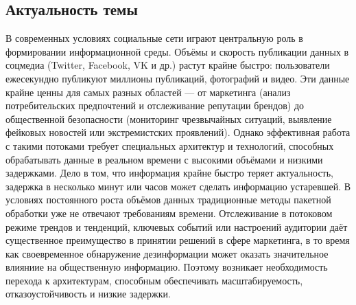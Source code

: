     \subsection{Актуальность темы}
        В современных условиях социальные сети играют центральную роль в формировании информационной среды. Объёмы и скорость публикации данных в соцмедиа (Twitter, Facebook, VK и др.) растут крайне быстро: пользователи ежесекундно публикуют миллионы публикаций, фотографий и видео. Эти данные крайне ценны для самых разных областей — от маркетинга (анализ потребительских предпочтений и отслеживание репутации брендов) до общественной безопасности (мониторинг чрезвычайных ситуаций, выявление фейковых новостей или экстремистских проявлений). Однако эффективная работа с такими потоками требует специальных архитектур и технологий, способных обрабатывать данные в реальном времени с высокими объёмами и низкими задержками. Дело в том, что информация крайне быстро теряет актуальность, задержка в несколько минут или часов может сделать информацию устаревшей. В условиях постоянного роста объёмов данных традиционные методы пакетной обработки уже не отвечают требованиям времени. Отслеживание в потоковом режиме трендов и тенденций, ключевых событий или настроений аудитории даёт существенное преимущество в принятии решений в сфере маркетинга, в то время как своевременное обнаружение дезинформации может оказать значительное влияниие на общественную информацию. Поэтому возникает необходимость перехода к архитектурам, способным обеспечивать масштабируемость, отказоустойчивость и низкие задержки.
\newpage
